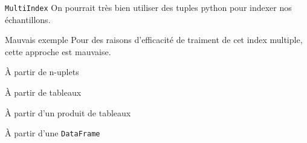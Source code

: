 \begin{frame}{\texttt{MultiIndex}}
    On pourrait très bien utiliser des tuples python pour indexer nos échantillons.
\end{frame}

\begin{frame}{Mauvais exemple}
    Pour des raisons d'efficacité de traiment de cet index multiple, cette approche est mauvaise.
\end{frame}
   
\begin{frame}{À partir de n-uplets}
\end{frame}

\begin{frame}{À partir de tableaux}
\end{frame}

\begin{frame}{À partir d'un produit de tableaux}
\end{frame}

\begin{frame}{À partir d'une \texttt{DataFrame}}
\end{frame}
